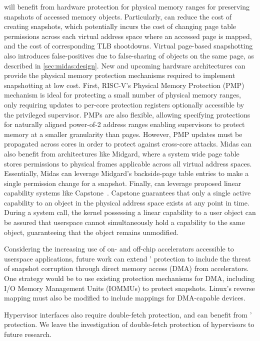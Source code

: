 \midas will benefit from hardware protection for physical memory
ranges for preserving snapshots of accessed memory objects.
Particularly, \midas can reduce the cost of creating snapshots, 
which potentially incurs the cost of changing page table 
permissions across each virtual address space where an accessed page
is mapped, and the cost of corresponding TLB shootdowns.
Virtual page-based snapshotting also introduces false-positives due to
false-sharing of objects on the same page, as described in 
\autoref{sec:midas:design}.
New and upcoming hardware architectures can provide the physical
memory protection mechanisms required to implement snapshotting at low cost.
First, RISC-V's Physical Memory Protection (PMP) mechanism is ideal for
protecting a small number of physical memory ranges, only requiring updates
to per-core protection registers optionally accessible by the privileged
supervisor. 
PMPs are also flexible, allowing specifying protections for naturally aligned
power-of-2 address ranges enabling supervisors to protect memory at a
smaller granularity than pages.
However, PMP updates must be propagated across cores in order to protect
against cross-core attacks.
Midas can also benefit from architectures like Midgard, where a system wide
page table stores permissions to physical frames applicable across all
virtual address spaces.
Essentially, Midas can leverage Midgard's backside-page table entries to
make a single permission change for a snapshot.
Finally, \midas can leverage proposed linear capability systems like 
Capstone~\cite{YuWBCS23}.
Capstone guarantees that only a single active capability to an object 
in the physical address space exists at any point in time.
During a system call, the kernel possessing a linear capability to 
a user object can be assured that userspace cannot simultaneously hold a 
capability to the same object, guaranteeing that the object remains
unmodified.

Considering the increasing use of on- and off-chip accelerators accessible to
userspace applications, future work can extend \midas' protection to include
the threat of snapshot corruption through direct memory access (DMA)
from accelerators.
One strategy would be to use existing protection mechanisms for DMA, including
I/O Memory Management Units (IOMMUs) to protect snapshots.
Linux's reverse mapping must also be modified to include mappings for 
DMA-capable devices.

Hypervisor interfaces also require double-fetch protection, and can benefit 
from \midas' protection.
We leave the investigation of double-fetch protection of hypervisors to future
research.

